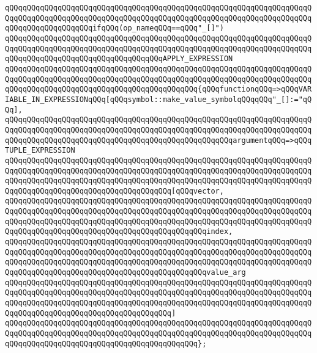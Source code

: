 \newline
\verb|qQQqqQQqqQQqqQQqqQQqqQQqqQQqqQQqqQQqqQQqqQQqqQQqqQQqqQQqqQQqqQQqqQQqqQQqqQQqqQQqqQQqqQQqqQQqqQQqqQQqqQQqqQQqqQQqqQQqqQQqqQQqqQQqqQQqqQQqqQQqqQQqqQQqqQQqqQQqqQQqifqQQq(op_nameqQQq==qQQq"_[]")|\newline
\newline
\verb|qQQqqQQqqQQqqQQqqQQqqQQqqQQqqQQqqQQqqQQqqQQqqQQqqQQqqQQqqQQqqQQqqQQqqQQqqQQqqQQqqQQqqQQqqQQqqQQqqQQqqQQqqQQqqQQqqQQqqQQqqQQqqQQqqQQqqQQqqQQqqQQqqQQqqQQqqQQqqQQqqQQqqQQqqQQqqQQqAPPLY_EXPRESSION|\newline
\verb|qQQqqQQqqQQqqQQqqQQqqQQqqQQqqQQqqQQqqQQqqQQqqQQqqQQqqQQqqQQqqQQqqQQqqQQqqQQqqQQqqQQqqQQqqQQqqQQqqQQqqQQqqQQqqQQqqQQqqQQqqQQqqQQqqQQqqQQqqQQqqQQqqQQqqQQqqQQqqQQqqQQqqQQqqQQqqQQqqQQqqQQq{qQQqfunctionqQQq=>qQQqVARIABLE_IN_EXPRESSIONqQQq[qQQqsymbol::make_value_symbolqQQqqQQq"_[]:="qQQq],|\newline
\verb|qQQqqQQqqQQqqQQqqQQqqQQqqQQqqQQqqQQqqQQqqQQqqQQqqQQqqQQqqQQqqQQqqQQqqQQqqQQqqQQqqQQqqQQqqQQqqQQqqQQqqQQqqQQqqQQqqQQqqQQqqQQqqQQqqQQqqQQqqQQqqQQqqQQqqQQqqQQqqQQqqQQqqQQqqQQqqQQqqQQqqQQqqQQqqQQqargumentqQQq=>qQQqTUPLE_EXPRESSION|\newline
\verb|qQQqqQQqqQQqqQQqqQQqqQQqqQQqqQQqqQQqqQQqqQQqqQQqqQQqqQQqqQQqqQQqqQQqqQQqqQQqqQQqqQQqqQQqqQQqqQQqqQQqqQQqqQQqqQQqqQQqqQQqqQQqqQQqqQQqqQQqqQQqqQQqqQQqqQQqqQQqqQQqqQQqqQQqqQQqqQQqqQQqqQQqqQQqqQQqqQQqqQQqqQQqqQQqqQQqqQQqqQQqqQQqqQQqqQQqqQQqqQQqqQQqqQQq[qQQqvector,|\newline
\verb|qQQqqQQqqQQqqQQqqQQqqQQqqQQqqQQqqQQqqQQqqQQqqQQqqQQqqQQqqQQqqQQqqQQqqQQqqQQqqQQqqQQqqQQqqQQqqQQqqQQqqQQqqQQqqQQqqQQqqQQqqQQqqQQqqQQqqQQqqQQqqQQqqQQqqQQqqQQqqQQqqQQqqQQqqQQqqQQqqQQqqQQqqQQqqQQqqQQqqQQqqQQqqQQqqQQqqQQqqQQqqQQqqQQqqQQqqQQqqQQqqQQqqQQqqQQqqQQqindex,|\newline
\verb|qQQqqQQqqQQqqQQqqQQqqQQqqQQqqQQqqQQqqQQqqQQqqQQqqQQqqQQqqQQqqQQqqQQqqQQqqQQqqQQqqQQqqQQqqQQqqQQqqQQqqQQqqQQqqQQqqQQqqQQqqQQqqQQqqQQqqQQqqQQqqQQqqQQqqQQqqQQqqQQqqQQqqQQqqQQqqQQqqQQqqQQqqQQqqQQqqQQqqQQqqQQqqQQqqQQqqQQqqQQqqQQqqQQqqQQqqQQqqQQqqQQqqQQqqQQqqQQqvalue_arg|\newline
\verb|qQQqqQQqqQQqqQQqqQQqqQQqqQQqqQQqqQQqqQQqqQQqqQQqqQQqqQQqqQQqqQQqqQQqqQQqqQQqqQQqqQQqqQQqqQQqqQQqqQQqqQQqqQQqqQQqqQQqqQQqqQQqqQQqqQQqqQQqqQQqqQQqqQQqqQQqqQQqqQQqqQQqqQQqqQQqqQQqqQQqqQQqqQQqqQQqqQQqqQQqqQQqqQQqqQQqqQQqqQQqqQQqqQQqqQQqqQQqqQQqqQQqqQQq]|\newline
\verb|qQQqqQQqqQQqqQQqqQQqqQQqqQQqqQQqqQQqqQQqqQQqqQQqqQQqqQQqqQQqqQQqqQQqqQQqqQQqqQQqqQQqqQQqqQQqqQQqqQQqqQQqqQQqqQQqqQQqqQQqqQQqqQQqqQQqqQQqqQQqqQQqqQQqqQQqqQQqqQQqqQQqqQQqqQQqqQQqqQQqqQQq};|\newline
